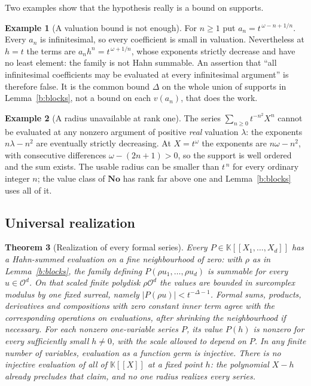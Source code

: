 \documentclass[11pt,a4paper]{article}
\numberwithin{equation}{section}
\newtheorem{theorem}{Theorem}[section]
\theoremstyle{definition}
\newtheorem{example}[theorem]{Example}
\theoremstyle{remark}
\theoremstyle{plain}
\newcommand{\K}{\mathbb K}
\newcommand{\No}{\mathbf{No}}
\newcommand{\Ov}{\mathcal O}
\newcommand{\tm}{t}
\newcommand{\abs}[1]{\lvert #1\rvert}
\begin{document}
Two examples show that the hypothesis really is a bound on supports.

\begin{example}[A valuation bound is not enough]
\label{b:badcoeff}
For $n\ge1$ put $a_n=\tm^{\,\omega-n+1/n}$. Every $a_n$ is infinitesimal,
so every coefficient is small in valuation. Nevertheless at $h=\tm$ the
terms are $a_nh^{n}=\tm^{\,\omega+1/n}$, whose exponents strictly decrease
and have no least element: the family is not Hahn summable. An assertion
that ``all infinitesimal coefficients may be evaluated at every
infinitesimal argument'' is therefore false. It is the common bound
$\Delta$ on the whole union of supports in Lemma~\ref{b:blocks}, not a
bound on each $v(a_n)$, that does the work.
\end{example}

\begin{example}[A radius unavailable at rank one]
\label{b:rank}
The series $\sum_{n\ge0}\tm^{-n^{2}}X^{n}$ cannot be evaluated at any
nonzero argument of positive \emph{real} valuation $\lambda$: the
exponents $n\lambda-n^{2}$ are eventually strictly decreasing. At
$X=\tm^{\omega}$ the exponents are $n\omega-n^{2}$, with consecutive
differences $\omega-(2n+1)>0$, so the support is well ordered and the sum
exists. The usable radius can be smaller than $\tm^{\,n}$ for every
ordinary integer $n$; the value class of $\No$ has rank far above one and
Lemma~\ref{b:blocks} uses all of it.
\end{example}

\subsection{Universal realization}

\begin{theorem}[Realization of every formal series]
\label{b:realization}
Every $P\in\K[[X_1,\ldots,X_d]]$ has a Hahn-summed evaluation on a fine
neighbourhood of zero: with $\rho$ as in Lemma~\ref{b:blocks}, the family
defining $P(\rho u_1,\ldots,\rho u_d)$ is summable for every
$u\in\Ov^{d}$. On that scaled finite polydisk $\rho\Ov^d$ the values are bounded in
surcomplex modulus by one fixed surreal, namely
$\abs{P(\rho u)}<\tm^{-\Delta-1}$. Formal sums, products, derivatives and
compositions with zero constant inner term agree with the corresponding
operations on evaluations, after shrinking the neighbourhood if necessary.
For each nonzero one-variable series $P$, its value $P(h)$ is nonzero
for every sufficiently small $h\ne0$, with the scale allowed to depend
on $P$. In any finite number of variables, evaluation as a
\emph{function germ} is injective. There is no injective evaluation of
all of $\K[[X]]$ at a fixed point $h$: the polynomial $X-h$ already
precludes that claim, and no one radius realizes every series.
\end{theorem}
\end{document}

